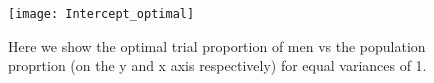 \begin{figure}[ht!]
  \centering
	\texttt{[image: Intercept\_optimal]}
	\caption{Here we show the optimal trial proportion of men vs the population proprtion (on the y and x axis respectively) for equal variances of 1.} 
\end{figure}



